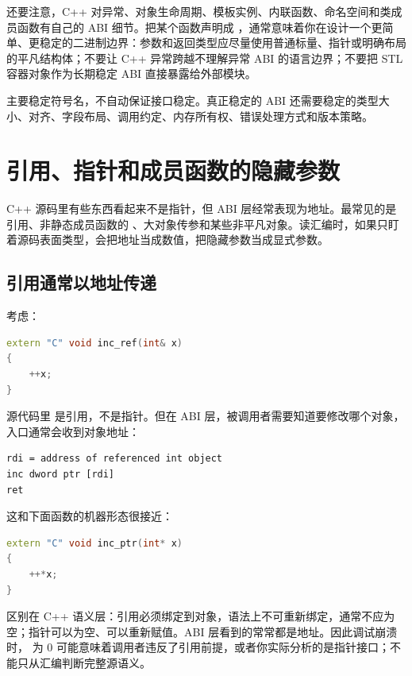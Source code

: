 还要注意，C++ 对异常、对象生命周期、模板实例、内联函数、命名空间和类成员函数有自己的 ABI 细节。把某个函数声明成 ，通常意味着你在设计一个更简单、更稳定的二进制边界：参数和返回类型应尽量使用普通标量、指针或明确布局的平凡结构体；不要让 C++ 异常跨越不理解异常 ABI 的语言边界；不要把 STL 容器对象作为长期稳定 ABI 直接暴露给外部模块。

\begin{keyidea}
 主要稳定符号名，不自动保证接口稳定。真正稳定的 ABI 还需要稳定的类型大小、对齐、字段布局、调用约定、内存所有权、错误处理方式和版本策略。
\end{keyidea}

\section{引用、指针和成员函数的隐藏参数}

C++ 源码里有些东西看起来不是指针，但 ABI 层经常表现为地址。最常见的是引用、非静态成员函数的 、大对象传参和某些非平凡对象。读汇编时，如果只盯着源码表面类型，会把地址当成数值，把隐藏参数当成显式参数。

\subsection{引用通常以地址传递}

考虑：

\begin{lstlisting}[language=C++]
extern "C" void inc_ref(int& x)
{
    ++x;
}
\end{lstlisting}

源代码里  是引用，不是指针。但在 ABI 层，被调用者需要知道要修改哪个对象，入口通常会收到对象地址：

\begin{lstlisting}
rdi = address of referenced int object
inc dword ptr [rdi]
ret
\end{lstlisting}

这和下面函数的机器形态很接近：

\begin{lstlisting}[language=C++]
extern "C" void inc_ptr(int* x)
{
    ++*x;
}
\end{lstlisting}

区别在 C++ 语义层：引用必须绑定到对象，语法上不可重新绑定，通常不应为空；指针可以为空、可以重新赋值。ABI 层看到的常常都是地址。因此调试崩溃时， 为 0 可能意味着调用者违反了引用前提，或者你实际分析的是指针接口；不能只从汇编判断完整源语义。

